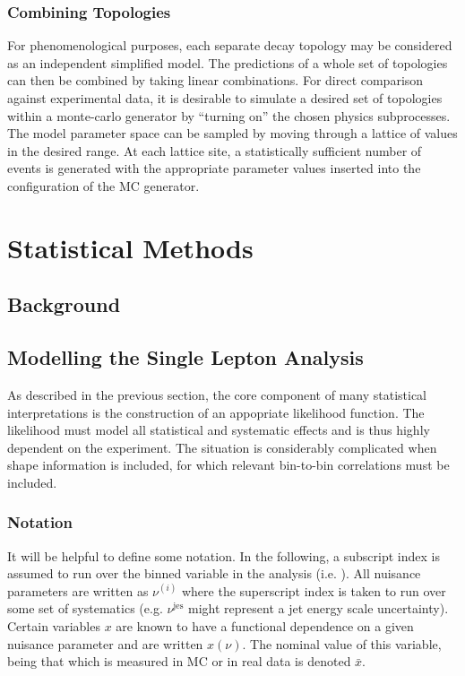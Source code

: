 \subsubsection{Combining Topologies}
For phenomenological purposes, each separate decay topology may be considered as
an independent simplified model. The predictions of a whole set of topologies
can then be combined by taking linear combinations. For direct comparison
against experimental data, it is desirable to simulate a desired set of
topologies within a monte-carlo generator by ``turning on'' the chosen physics
subprocesses. The model parameter space can be sampled by moving through a
lattice of values in the desired range. At each lattice site, a statistically
sufficient number of events is generated with the appropriate parameter values
inserted into the configuration of the \ac{MC} generator.

\section{Statistical Methods}
\subsection{Background}

\subsection{Modelling the Single Lepton Analysis}
As described in the previous section, the core component of many statistical
interpretations is the construction of an appopriate likelihood function. The
likelihood must model all statistical and systematic effects and is thus highly
dependent on the experiment. The situation is considerably complicated when
shape information is included, for which relevant bin-to-bin correlations must
be included.

\subsubsection{Notation}
It will be helpful to define some notation. In the following, a subscript index
is assumed to run over the binned variable in the analysis
(i.e. \STlep). All nuisance parameters are written as $\nu^{(i)}$ where the
superscript index is taken to run over some set of systematics
(e.g. $\nu^{\textrm{jes}}$ might represent a jet energy scale
uncertainty). Certain variables $x$ are known to have a functional dependence on a
given nuisance parameter and are written $x(\nu)$. The nominal value of this
variable, being that which is measured in \ac{MC} or in real data is denoted
$\bar{x}$.

